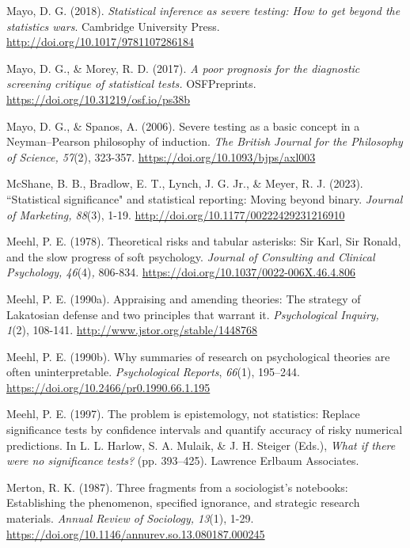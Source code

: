 \documentclass[authordate, meta]{jote-new-article}
\begin{document}
	Mayo, D. G. (2018). \emph{Statistical inference as severe testing: How to get beyond the statistics wars}. Cambridge University Press. \url{http://doi.org/10.1017/9781107286184}



	Mayo, D. G., \& Morey, R. D. (2017). \emph{A poor prognosis for the diagnostic screening critique of statistical tests.} OSFPreprints. \url{https://doi.org/10.31219/osf.io/ps38b}



	Mayo, D. G., \& Spanos, A. (2006). Severe testing as a basic concept in a Neyman--Pearson philosophy of induction. \emph{The British Journal for the Philosophy of Science, 57}(2), 323-357. \url{https://doi.org/10.1093/bjps/axl003}



	McShane, B. B., Bradlow, E. T., Lynch, J. G. Jr., \& Meyer, R. J. (2023). “Statistical significance" and statistical reporting: Moving beyond binary. \emph{Journal of Marketing, 88}(3), 1-19. \url{http://doi.org/10.1177/00222429231216910}



	Meehl, P. E. (1978). Theoretical risks and tabular asterisks: Sir Karl, Sir Ronald, and the slow progress of soft psychology. \emph{Journal of Consulting and Clinical Psychology, 46}(4)\emph{,} 806-834. \url{https://doi.org/10.1037/0022-006X.46.4.806}



	Meehl, P. E. (1990a). Appraising and amending theories: The strategy of Lakatosian defense and two principles that warrant it. \emph{Psychological Inquiry, 1}(2), 108-141. \url{http://www.jstor.org/stable/1448768}



	Meehl, P. E. (1990b). Why summaries of research on psychological theories are often uninterpretable. \emph{Psychological Reports}, \emph{66}(1), 195--244. \url{https://doi.org/10.2466/pr0.1990.66.1.195}



	Meehl, P. E. (1997). The problem is epistemology, not statistics: Replace significance tests by confidence intervals and quantify accuracy of risky numerical predictions. In L. L. Harlow, S. A. Mulaik, \& J. H. Steiger (Eds.), \emph{What if there were no significance tests?} (pp. 393--425). Lawrence Erlbaum Associates.



	Merton, R. K. (1987). Three fragments from a sociologist's notebooks: Establishing the phenomenon, specified ignorance, and strategic research materials. \emph{Annual Review of Sociology, 13}(1), 1-29. \url{https://doi.org/10.1146/annurev.so.13.080187.000245}
\end{document}
